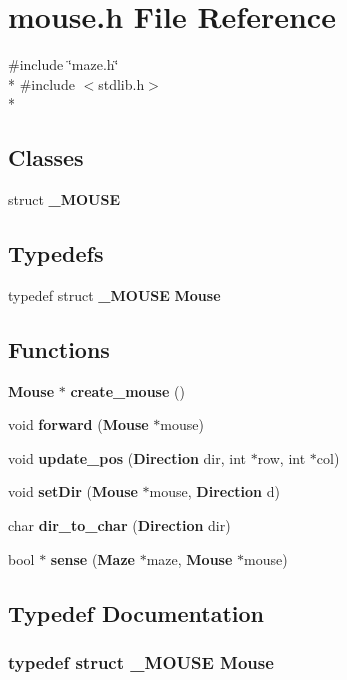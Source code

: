 \section{mouse.\-h File Reference}
\label{mouse_8h}
{\ttfamily \#include \char`\"{}maze.\-h\char`\"{}}\\*
{\ttfamily \#include $<$stdlib.\-h$>$}\\*
\subsection*{Classes}
\begin{DoxyCompactItemize}
\item 
struct {\bf \-\_\-\-M\-O\-U\-S\-E}
\end{DoxyCompactItemize}
\subsection*{Typedefs}
\begin{DoxyCompactItemize}
\item 
typedef struct {\bf \-\_\-\-M\-O\-U\-S\-E} {\bf Mouse}
\end{DoxyCompactItemize}
\subsection*{Functions}
\begin{DoxyCompactItemize}
\item 
{\bf Mouse} $\ast$ {\bf create\-\_\-mouse} ()
\item 
void {\bf forward} ({\bf Mouse} $\ast$mouse)
\item 
void {\bf update\-\_\-pos} ({\bf Direction} dir, int $\ast$row, int $\ast$col)
\item 
void {\bf set\-Dir} ({\bf Mouse} $\ast$mouse, {\bf Direction} d)
\item 
char {\bf dir\-\_\-to\-\_\-char} ({\bf Direction} dir)
\item 
bool $\ast$ {\bf sense} ({\bf Maze} $\ast$maze, {\bf Mouse} $\ast$mouse)
\end{DoxyCompactItemize}


\subsection{Typedef Documentation}
\subsubsection[{Mouse}]{\setlength{\rightskip}{0pt plus 5cm}typedef struct {\bf \-\_\-\-M\-O\-U\-S\-E} {\bf Mouse}}\label{mouse_8h_abb5928e9a831a8f44279a4263ac3b13d}


